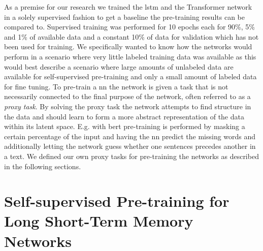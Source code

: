 As a premise for our research we trained the \gls{lstm} and the Transformer network in a solely supervised fashion to get a baseline the pre-training results can be compared to. Supervised training was performed for 10 epochs each for 90\%, 5\% and 1\% of available data and a constant 10\% of data for validation which has not been used for training. We specifically wanted to know how the networks would perform in a scenario where very little labeled training data was available as this would best describe a scenario where large amounts of unlabeled data are available for self-supervised pre-training and only a small amount of labeled data for fine tuning. To pre-train a \gls{nn} the network is given a task that is not necessarily connected to the final purpose of the network, often referred to as a \textit{proxy task}. By solving the proxy task the network attempts to find structure in the data and should learn to form a more abstract representation of the data within its latent space. E.g. with \gls{bert} pre-training is performed by masking a certain percentage of the input and having the \gls{nn} predict the missing words and additionally letting the network guess whether one sentences precedes another in a text. We defined our own proxy tasks for pre-training the networks as described in the following sections.


\section{Self-supervised Pre-training for Long Short-Term Memory Networks} \label{sec:experiments_lstm}

